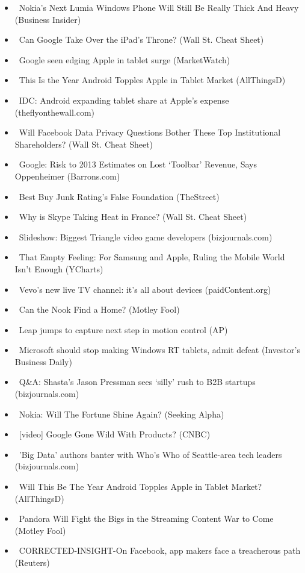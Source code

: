 \documentclass[11pt,asymmetric]{article}
\begin{document}
\begin{itemize}
\item\ Nokia's Next Lumia Windows Phone Will Still Be Really Thick And Heavy (Business Insider)
\item\ Can Google Take Over the iPad’s Throne? (Wall St. Cheat Sheet)
\item\ Google seen edging Apple in tablet surge (MarketWatch)
\item\ This Is the Year Android Topples Apple in Tablet Market (AllThingsD)
\item\ IDC: Android expanding tablet share at Apple's expense (theflyonthewall.com)
\item\ Will Facebook Data Privacy Questions Bother These Top Institutional Shareholders? (Wall St. Cheat Sheet)
\item\ Google: Risk to 2013 Estimates on Lost `Toolbar' Revenue, Says Oppenheimer (Barrons.com)
\item\ Best Buy Junk Rating's False Foundation (TheStreet)
\item\ Why is Skype Taking Heat in France? (Wall St. Cheat Sheet)
\item\ Slideshow: Biggest Triangle video game developers (bizjournals.com)
\item\ That Empty Feeling: For Samsung and Apple, Ruling the Mobile World Isn’t Enough (YCharts)
\item\ Vevo’s new live TV channel: it’s all about devices (paidContent.org)
\item\ Can the Nook Find a Home? (Motley Fool)
\item\ Leap jumps to capture next step in motion control (AP)
\item\ Microsoft should stop making Windows RT tablets, admit defeat (Investor's Business Daily)
\item\ Q\&A: Shasta's Jason Pressman sees `silly' rush to B2B startups (bizjournals.com)
\item\ Nokia: Will The Fortune Shine Again? (Seeking Alpha)
\item\ [video] Google Gone Wild With Products? (CNBC)
\item\ 'Big Data' authors banter with Who's Who of Seattle-area tech leaders (bizjournals.com)
\item\ Will This Be The Year Android Topples Apple in Tablet Market? (AllThingsD)
\item\ Pandora Will Fight the Bigs in the Streaming Content War to Come (Motley Fool)
\item\ CORRECTED-INSIGHT-On Facebook, app makers face a treacherous path (Reuters)

\end{itemize}
\end{document}
